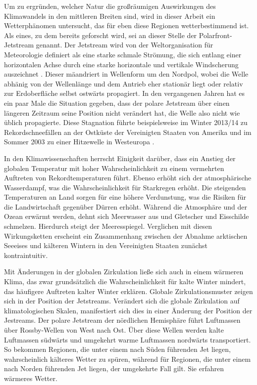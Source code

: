 Um zu ergründen, welcher Natur die großräumigen Auswirkungen des Klimawandels in den mittleren Breiten sind, wird in dieser Arbeit ein Wetterphänomen untersucht, das für eben diese Regionen wetterbestimmend ist. Als eines, zu dem bereits geforscht wird, sei an dieser Stelle der Polarfront-Jetstream genannt. Der Jetstream wird von der Weltorganisation für Meteorologie definiert als eine starke schmale Strömung, die sich entlang einer horizontalen Achse durch eine starke horizontale und vertikale Windscherung auszeichnet \citep{wmo-1958}. Dieser mäandriert in Wellenform um den Nordpol, wobei die Welle abhänig von der Wellenlänge und dem Antrieb eher stationär liegt oder relativ zur Erdoberfläche selbst ostwärts propagiert. In den vergangenen Jahren hat es ein paar Male die Situation gegeben, dass der polare Jetstream über einen längeren Zeitraum seine Position nicht verändert hat, die Welle also nicht wie üblich propagierte. Diese Stagnation führte beispielsweise im Winter 2013/14 zu Rekordschneefällen an der Ostküste der Vereinigten Staaten von Amerika \citep{palmer-2014} und im Sommer 2003 zu einer Hitzewelle in Westeuropa \citep{petoukhov-2013}.

In den Klimawissenschaften herrscht Einigkeit darüber, dass ein Anstieg der globalen Temperatur mit hoher Wahrscheinlichkeit zu einem vermehrten Auftreten von Rekordtemperaturen führt. Ebenso erhöht sich der atmosphärische Wasserdampf, was die Wahrscheinlichkeit für Starkregen erhöht. Die steigenden Temperaturen an Land sorgen für eine höhere Verdunstung, was die Risiken für die Landwirtschaft gegenüber Dürren erhöht. Während die Atmosphäre und der Ozean erwärmt werden, dehnt sich Meerwasser aus und Gletscher und Eisschilde schmelzen. Hierdurch steigt der Meeresspiegel. Verglichen mit diesen Wirkungsketten erscheint ein Zusammenhang zwischen der Abnahme arktischen Seeeises und kälteren Wintern in den Vereinigten Staaten zunächst kontraintuitiv. \citep{wallace-2014}

Mit Änderungen in der globalen Zirkulation ließe sich auch in einem wärmeren Klima, das zwar grundsätzlich die Wahrscheinlichkeit für kalte Winter mindert, das häufigere Auftreten kalter Winter erklären. Globale Zirkulationsmuster zeigen sich in der Position der Jetstreams. Verändert sich die globale Zirkulation auf klimatologischen Skalen, manifestiert sich dies in einer Änderung der Position der Jestreams. Der polare Jetstream der nördlichen Hemisphäre führt Luftmassen über Rossby-Wellen von West nach Ost. Über diese Wellen werden kalte Luftmassen südwärts und umgekehrt warme Luftmassen nordwärts transportiert. So bekommen Regionen, die unter einem nach Süden führenden Jet liegen, wahrscheinlich kälteres Wetter zu spüren, während für Regionen, die unter einem nach Norden führenden Jet liegen, der umgekehrte Fall gilt. Sie erfahren wärmeres  Wetter. \citep{palmer-2014}


